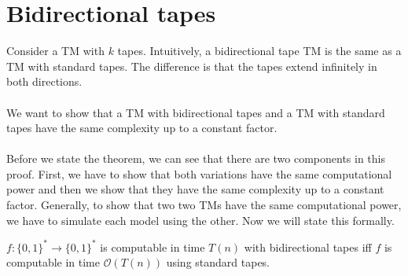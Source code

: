 \documentclass[usletter]{article}
\begin{document}
\section{Bidirectional tapes}
Consider a TM with $k$ tapes. Intuitively, a bidirectional tape TM is the same as a TM with standard tapes. The difference is that the tapes extend infinitely in both directions. 
\\\\
We want to show that a TM with bidirectional tapes and a TM with standard tapes have the same complexity up to a constant factor.
\\\\
Before we state the theorem, we can see that there are two components in this proof. First, we have to show that both variations have the same computational power and then we show that they have the same complexity up to a constant factor. Generally, to show that two two TMs have the same computational power, we have to simulate each model using the other. Now we will state this formally.

\begin{theorem}
$f: \{0,1\}^* \rightarrow \{0,1\}^*$ is computable in time $T(n)$ with bidirectional tapes iff $f$ is computable in time $\mathcal{O}(T(n))$ using standard tapes.
\end{theorem}
\end{document}

